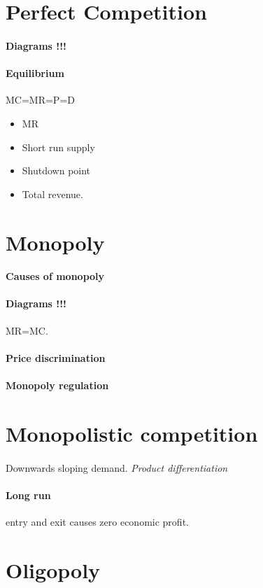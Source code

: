 \documentclass{article}
\begin{document}
	\section{Perfect Competition}
	\paragraph{Diagrams !!!}
	\paragraph{Equilibrium} MC=MR=P=D
	\begin{itemize}
		\item MR
		\item Short run supply
		\item Shutdown point
		\item Total revenue.
	\end{itemize}
	\section{Monopoly}
	\paragraph{Causes of monopoly}
	\paragraph{Diagrams !!!} MR=MC.
	\paragraph{Price discrimination}
	\paragraph{Monopoly regulation}
	\section{Monopolistic competition}
	\paragraph{} Downwards sloping demand. \emph{Product differentiation}
	\paragraph{Long run} entry and exit causes zero economic profit.
	\section{Oligopoly}
\end{document}
